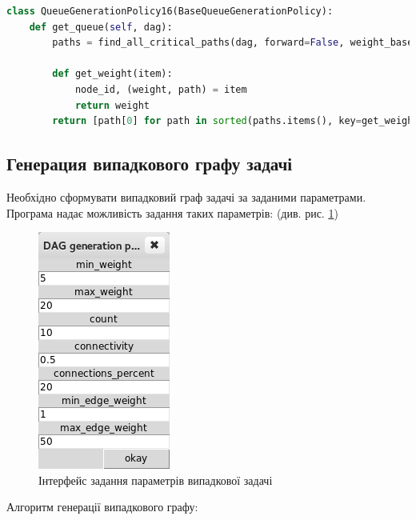 \begin{lstlisting}[language=Python,caption={Алгоритм 16},label=lst:a16]
class QueueGenerationPolicy16(BaseQueueGenerationPolicy):
    def get_queue(self, dag):
        paths = find_all_critical_paths(dag, forward=False, weight_based=True)

        def get_weight(item):
            node_id, (weight, path) = item
            return weight
        return [path[0] for path in sorted(paths.items(), key=get_weight)]

\end{lstlisting}

\subsection{Генерация випадкового графу задачі}    

Необхідно сформувати випадковий граф задачі за заданими параметрами. Програма надає можливість задання таких параметрів: (див. рис. \ref{fig:random_params})

    \begin{figure}[h!]
      \begin{center}
        \includegraphics{res/random.png}
      \end{center}
      \caption{Інтерфейс задання параметрів випадкової задачі}
    \label{fig:random_params}
    \end{figure}

Алгоритм генерації випадкового графу:


